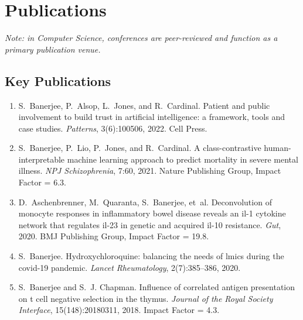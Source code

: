 \documentclass[11pt,a4paper]{article}
\begin{document}
\section*{Publications}

\textit{Note: in Computer Science, conferences are peer-reviewed and function as a primary publication venue.}

\subsection*{Key Publications}
\begin{enumerate}
  \item S.~Banerjee, P.~Alsop, L.~Jones, and R.~Cardinal. Patient and public involvement to build trust in artificial intelligence: a framework, tools and case studies. {\em Patterns}, 3(6):100506, 2022. Cell Press.
  \item S.~Banerjee, P.~Lio, P.~Jones, and R.~Cardinal. A class-contrastive human-interpretable machine learning approach to predict mortality in severe mental illness. {\em NPJ Schizophrenia}, 7:60, 2021. Nature Publishing Group, Impact Factor = 6.3.
  \item D.~Aschenbrenner, M.~Quaranta, S.~Banerjee, et~al. Deconvolution of monocyte responses in inflammatory bowel disease reveals an il-1 cytokine network that regulates il-23 in genetic and acquired il-10 resistance. {\em Gut}, 2020. BMJ Publishing Group, Impact Factor = 19.8.
  \item S.~Banerjee. Hydroxychloroquine: balancing the needs of lmics during the covid-19 pandemic. {\em Lancet Rheumatology}, 2(7):385--386, 2020.
  \item S.~Banerjee and S.~J. Chapman. Influence of correlated antigen presentation on t cell negative selection in the thymus. {\em Journal of the Royal Society Interface}, 15(148):20180311, 2018. Impact Factor = 4.3.
\end{enumerate}
\end{document}
